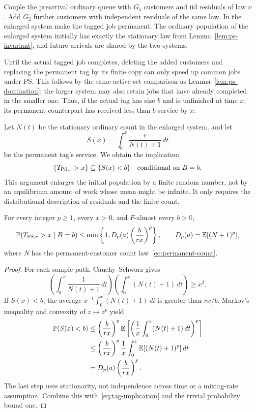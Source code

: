 Couple the prearrival ordinary queue with $G_1$ customers and iid residuals of law $\nu$. Add $G_2$ further customers with independent residuals of the same law. In the enlarged system make the tagged job permanent. The ordinary population of the enlarged system initially has exactly the stationary law from Lemma~\ref{lem:ps-invariant}, and future arrivals are shared by the two systems.

Until the actual tagged job completes, deleting the added customers and replacing the permanent tag by its finite copy can only speed up common jobs under PS. This follows by the same active-set comparison as Lemma~\ref{lem:ps-domination}; the larger system may also retain jobs that have already completed in the smaller one. Thus, if the actual tag has size $b$ and is unfinished at time $x$, its permanent counterpart has received less than $b$ service by $x$.

Let $N(t)$ be the stationary ordinary count in the enlarged system, and let
\begin{equation}\label{eq:permanent-service}
 S(x)=\int_0^x\frac r{N(t)+1}\,dt
\end{equation}
be the permanent tag's service. We obtain the implication
\begin{equation}\label{eq:tag-implication}
 \{T_{\operatorname{PS},r}>x\}\subseteq\{S(x)<b\}
 \quad\hbox{conditional on }B=b.
\end{equation}
This argument enlarges the initial population by a finite random number, not by an equilibrium amount of work whose mean might be infinite. It only requires the distributional description of residuals and the finite count.

\begin{lemma}\label{lem:conditional-ps}
For every integer $p\geq1$, every $x>0$, and $F$-almost every $b>0$,
\begin{equation}\label{eq:conditional-tail}
 \mathbb P(T_{\operatorname{PS},r}>x\mid B=b)
  \leq\min\left\{1,D_p(a)\left(\frac b{rx}\right)^p\right\},
 \qquad D_p(a)=\mathbb E[(N+1)^p],
\end{equation}
where $N$ has the permanent-customer count law~\eqref{eq:permanent-count}.
\end{lemma}
\begin{proof}
For each sample path, Cauchy--Schwarz gives
\[
 \left(\int_0^x\frac1{N(t)+1}\,dt\right)
 \left(\int_0^x(N(t)+1)\,dt\right)\geq x^2.
\]
If $S(x)<b$, the average $x^{-1}\int_0^x(N(t)+1)\,dt$ is greater than $rx/b$. Markov's inequality and convexity of $z\mapsto z^p$ yield
\begin{align*}
 \mathbb P(S(x)<b)
 &\leq\left(\frac b{rx}\right)^p
      \mathbb E\left[\left(\frac1x\int_0^x(N(t)+1)\,dt\right)^p\right]\\
 &\leq\left(\frac b{rx}\right)^p
      \frac1x\int_0^x\mathbb E[(N(t)+1)^p]\,dt\\
 &=D_p(a)\left(\frac b{rx}\right)^p.
\end{align*}
The last step uses stationarity, not independence across time or a mixing-rate assumption. Combine this with~\eqref{eq:tag-implication} and the trivial probability bound one.
\end{proof}

